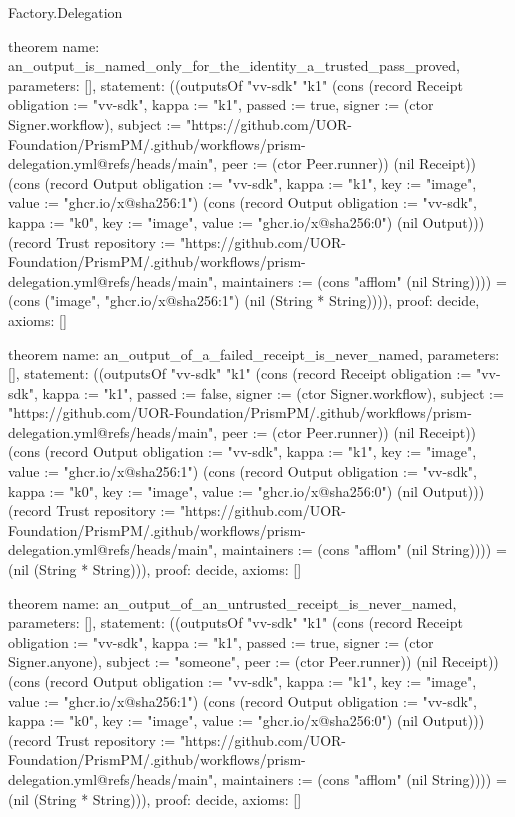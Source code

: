 \begin{lexlean}{Factory.Delegation}
\begin{semanticmodule}
theorem{
  name: an_output_is_named_only_for_the_identity_a_trusted_pass_proved,
  parameters: [],
  statement: ((outputsOf "vv-sdk" "k1" (cons (record Receipt {obligation := "vv-sdk", kappa := "k1", passed := true, signer := (ctor Signer.workflow), subject := "https://github.com/UOR-Foundation/PrismPM/.github/workflows/prism-delegation.yml@refs/heads/main", peer := (ctor Peer.runner)}) (nil Receipt)) (cons (record Output {obligation := "vv-sdk", kappa := "k1", key := "image", value := "ghcr.io/x@sha256:1"}) (cons (record Output {obligation := "vv-sdk", kappa := "k0", key := "image", value := "ghcr.io/x@sha256:0"}) (nil Output))) (record Trust {repository := "https://github.com/UOR-Foundation/PrismPM/.github/workflows/prism-delegation.yml@refs/heads/main", maintainers := (cons "afflom" (nil String))})) = (cons ("image", "ghcr.io/x@sha256:1") (nil (String * String)))),
  proof: decide{},
  axioms: []
}

theorem{
  name: an_output_of_a_failed_receipt_is_never_named,
  parameters: [],
  statement: ((outputsOf "vv-sdk" "k1" (cons (record Receipt {obligation := "vv-sdk", kappa := "k1", passed := false, signer := (ctor Signer.workflow), subject := "https://github.com/UOR-Foundation/PrismPM/.github/workflows/prism-delegation.yml@refs/heads/main", peer := (ctor Peer.runner)}) (nil Receipt)) (cons (record Output {obligation := "vv-sdk", kappa := "k1", key := "image", value := "ghcr.io/x@sha256:1"}) (cons (record Output {obligation := "vv-sdk", kappa := "k0", key := "image", value := "ghcr.io/x@sha256:0"}) (nil Output))) (record Trust {repository := "https://github.com/UOR-Foundation/PrismPM/.github/workflows/prism-delegation.yml@refs/heads/main", maintainers := (cons "afflom" (nil String))})) = (nil (String * String))),
  proof: decide{},
  axioms: []
}

theorem{
  name: an_output_of_an_untrusted_receipt_is_never_named,
  parameters: [],
  statement: ((outputsOf "vv-sdk" "k1" (cons (record Receipt {obligation := "vv-sdk", kappa := "k1", passed := true, signer := (ctor Signer.anyone), subject := "someone", peer := (ctor Peer.runner)}) (nil Receipt)) (cons (record Output {obligation := "vv-sdk", kappa := "k1", key := "image", value := "ghcr.io/x@sha256:1"}) (cons (record Output {obligation := "vv-sdk", kappa := "k0", key := "image", value := "ghcr.io/x@sha256:0"}) (nil Output))) (record Trust {repository := "https://github.com/UOR-Foundation/PrismPM/.github/workflows/prism-delegation.yml@refs/heads/main", maintainers := (cons "afflom" (nil String))})) = (nil (String * String))),
  proof: decide{},
  axioms: []
}


\end{semanticmodule}
\end{lexlean}
